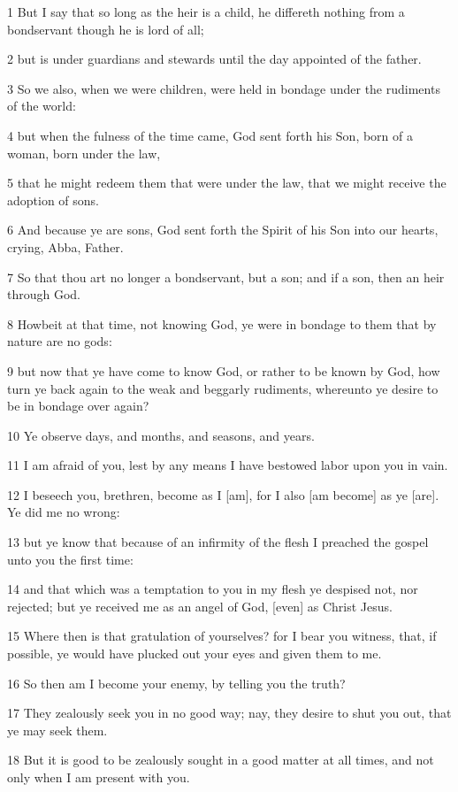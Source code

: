 \par 1 But I say that so long as the heir is a child, he differeth nothing from a bondservant though he is lord of all;
\par 2 but is under guardians and stewards until the day appointed of the father.
\par 3 So we also, when we were children, were held in bondage under the rudiments of the world:
\par 4 but when the fulness of the time came, God sent forth his Son, born of a woman, born under the law,
\par 5 that he might redeem them that were under the law, that we might receive the adoption of sons.
\par 6 And because ye are sons, God sent forth the Spirit of his Son into our hearts, crying, Abba, Father.
\par 7 So that thou art no longer a bondservant, but a son; and if a son, then an heir through God.
\par 8 Howbeit at that time, not knowing God, ye were in bondage to them that by nature are no gods:
\par 9 but now that ye have come to know God, or rather to be known by God, how turn ye back again to the weak and beggarly rudiments, whereunto ye desire to be in bondage over again?
\par 10 Ye observe days, and months, and seasons, and years.
\par 11 I am afraid of you, lest by any means I have bestowed labor upon you in vain.
\par 12 I beseech you, brethren, become as I [am], for I also [am become] as ye [are]. Ye did me no wrong:
\par 13 but ye know that because of an infirmity of the flesh I preached the gospel unto you the first time:
\par 14 and that which was a temptation to you in my flesh ye despised not, nor rejected; but ye received me as an angel of God, [even] as Christ Jesus.
\par 15 Where then is that gratulation of yourselves? for I bear you witness, that, if possible, ye would have plucked out your eyes and given them to me.
\par 16 So then am I become your enemy, by telling you the truth?
\par 17 They zealously seek you in no good way; nay, they desire to shut you out, that ye may seek them.
\par 18 But it is good to be zealously sought in a good matter at all times, and not only when I am present with you.
